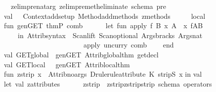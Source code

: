 \begin{isabellebody}
\ \ {\isacharparenleft}{\isachardoublequote}zelim{\isacharunderscore}pre{\isachardoublequote}{\isacharcomma}nat{\isacharunderscore}arg\ zelim{\isacharunderscore}pre{\isacharunderscore}meth{\isacharcomma}{\isachardoublequote}eliminate\ schema\ pre{\isachardoublequote}{\isacharparenright}\ \isanewline
\isanewline
\ {\isacharbrackright}\isanewline
\isanewline
val\ {\isacharunderscore}\ {\isacharequal}\ Context{\isachardot}add{\isacharunderscore}setup\ {\isacharbrackleft}Method{\isachardot}add{\isacharunderscore}methods\ zmethods{\isacharbrackright}{\isacharsemicolon}\isanewline
\isanewline
\ \ \ {\isacharverbatimclose}\isanewline
\isanewline
{}\isamarkupfalse%
{\isacharverbatimopen}\ \isanewline
\isanewline
local\isanewline
fun\ gen{\isacharunderscore}GET\ thmP\ comb\ {\isacharequal}\ \isanewline
\ \ \ \ let\ fun\ apply\ f\ B\ {\isacharparenleft}x{\isacharcomma}\ A{\isacharparenright}\ {\isacharequal}\ {\isacharparenleft}x{\isacharcomma}\ f{\isacharparenleft}A{\isacharcomma}B{\isacharparenright}{\isacharparenright}\ \isanewline
\ \ \ \ in\ Attrib{\isachardot}syntax\ {\isacharparenleft}\ Scan{\isachardot}lift\ {\isacharparenleft}Scan{\isachardot}optional\ {\isacharparenleft}Args{\isachardot}bracks\ Args{\isachardot}nat{\isacharparenright}\ {}{\isacharparenright}\ {\isachargreater}{\isachargreater}\ \isanewline
\ \ \ \ \ \ \ \ \ \ \ \ \ \ \ \ \ \ \ \ \ \ \ {\isacharparenleft}apply\ {\isacharparenleft}uncurry\ comb{\isacharparenright}{\isacharparenright}{\isacharparenright}\isanewline
\ \ \ \ end{\isacharsemicolon}\isanewline
val\ GET{\isacharunderscore}global\ {\isacharequal}\ gen{\isacharunderscore}GET\ Attrib{\isachardot}global{\isacharunderscore}thm\ {\isacharparenleft}get{\isacharunderscore}decl{}{\isacharparenright}{\isacharsemicolon}\isanewline
val\ GET{\isacharunderscore}local\ \ {\isacharequal}\ gen{\isacharunderscore}GET\ Attrib{\isachardot}local{\isacharunderscore}thm{\isacharsemicolon}\isanewline
fun\ zstrip\ x\ {\isacharequal}\ Attrib{\isachardot}no{\isacharunderscore}args\ {\isacharparenleft}Drule{\isachardot}rule{\isacharunderscore}attribute\ {\isacharparenleft}K\ {\isacharparenleft}stripS{\isacharparenright}{\isacharparenright}{\isacharparenright}\ x{\isacharsemicolon}\isanewline
\isanewline
in\isanewline
\isanewline
val\ {\isacharunderscore}\ {\isacharequal}\ \isanewline
let\ val\ z{\isacharunderscore}attributes\ {\isacharequal}\ \isanewline
\ \ \ \ {\isacharbrackleft}{\isacharparenleft}{\isachardoublequote}zstrip{\isachardoublequote}{\isacharcomma}\ \ {\isacharparenleft}zstrip{\isacharcomma}zstrip{\isacharparenright}{\isacharcomma}{\isachardoublequote}strip\ schema\ operators{\isachardoublequote}{\isacharparenright}{\isacharcomma}\isanewline

\end{isabellebody}

